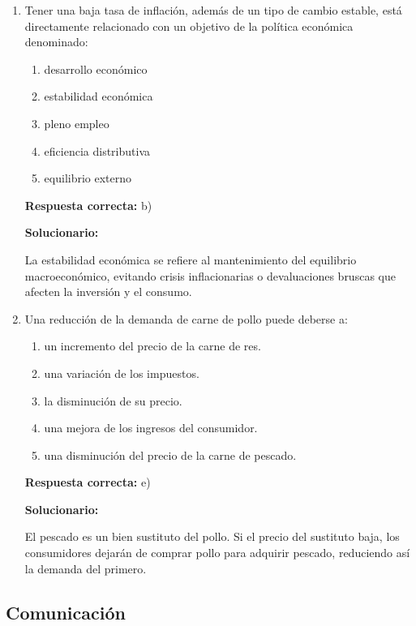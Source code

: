 \begin{enumerate}[resume]
	\vspace{6mm}

	\item Tener una baja tasa de inflación, además de un tipo de cambio estable, está directamente relacionado con un objetivo de la política económica denominado:
	\begin{enumerate}[label=\alph*)]
		\item desarrollo económico
		\item estabilidad económica
		\item pleno empleo
		\item eficiencia distributiva
		\item equilibrio externo
	\end{enumerate}
	\textbf{Respuesta correcta:} b)

	\vspace{2mm}
	\textbf{Solucionario:}

	La estabilidad económica se refiere al mantenimiento del equilibrio macroeconómico, evitando crisis inflacionarias o devaluaciones bruscas que afecten la inversión y el consumo.

	\vspace{6mm}

	\item Una reducción de la demanda de carne de pollo puede deberse a:
	\begin{enumerate}[label=\alph*)]
		\item un incremento del precio de la carne de res.
		\item una variación de los impuestos.
		\item la disminución de su precio.
		\item una mejora de los ingresos del consumidor.
		\item una disminución del precio de la carne de pescado.
	\end{enumerate}
	\textbf{Respuesta correcta:} e)

	\vspace{2mm}
	\textbf{Solucionario:}

	El pescado es un bien sustituto del pollo. Si el precio del sustituto baja, los consumidores dejarán de comprar pollo para adquirir pescado, reduciendo así la demanda del primero.

	\vspace{6mm}
\end{enumerate}


\subsection*{Comunicación}

